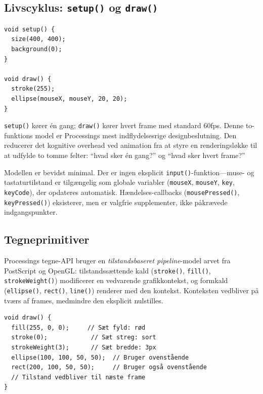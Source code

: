 \documentclass[10pt,letterpaper,twocolumn]{article}
\begin{document}
\subsection{Livscyklus: \texttt{setup()} og \texttt{draw()}}

\begin{lstlisting}[style=processingstyle,caption={Minimal Processing-skitse.}]
void setup() {
  size(400, 400);
  background(0);
}

void draw() {
  stroke(255);
  ellipse(mouseX, mouseY, 20, 20);
}
\end{lstlisting}

\texttt{setup()} kører én gang; \texttt{draw()} kører hvert frame med standard 60fps. Denne to-funktions model er Processings mest indflydelsesrige designbeslutning. Den reducerer det kognitive overhead ved animation fra at styre en renderingsløkke til at udfylde to tomme felter: ``hvad sker én gang?'' og ``hvad sker hvert frame?''

Modellen er bevidst minimal. Der er ingen eksplicit \texttt{input()}-funktion---muse- og tastaturtilstand er tilgængelig som globale variabler (\texttt{mouseX}, \texttt{mouseY}, \texttt{key}, \texttt{keyCode}), der opdateres automatisk. Hændelses-callbacks (\texttt{mousePressed()}, \texttt{keyPressed()}) eksisterer, men er valgfrie supplementer, ikke påkrævede indgangspunkter.

\subsection{Tegneprimitiver}

Processings tegne-API bruger en \emph{tilstandsbaseret pipeline}-model arvet fra PostScript og OpenGL: tilstandssættende kald (\texttt{stroke()}, \texttt{fill()}, \texttt{strokeWeight()}) modificerer en vedvarende grafikkontekst, og formkald (\texttt{ellipse()}, \texttt{rect()}, \texttt{line()}) renderer med den kontekst. Konteksten vedbliver på tværs af frames, medmindre den eksplicit nulstilles.

\begin{lstlisting}[style=processingstyle,caption={Tilstandsbaseret tegnekontekst.}]
void draw() {
  fill(255, 0, 0);     // Sæt fyld: rød
  stroke(0);            // Sæt streg: sort
  strokeWeight(3);      // Sæt bredde: 3px
  ellipse(100, 100, 50, 50);  // Bruger ovenstående
  rect(200, 100, 50, 50);     // Bruger også ovenstående
  // Tilstand vedbliver til næste frame
}
\end{lstlisting}
\end{document}
